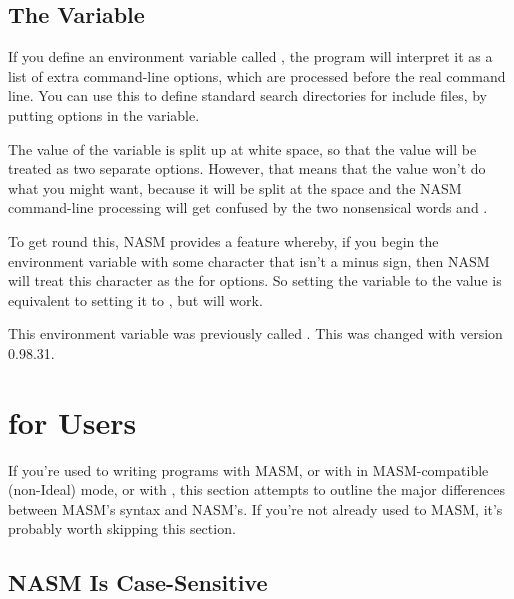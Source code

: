 \subsection{The   Variable}
\label{subsec:nasmenv}

If you define an environment variable called , the program
will interpret it as a list of extra command-line options, which are
processed before the real command line. You can use this to define
standard search directories for include files, by putting 
options in the  variable.

The value of the variable is split up at white space, so that the
value  will be treated as two separate options.
However, that means that the value  won't do
what you might want, because it will be split at the space and the
NASM command-line processing will get confused by the two
nonsensical words  and .

To get round this, NASM provides a feature whereby, if you begin the
 environment variable with some character that isn't
a minus sign, then NASM will treat this character as the
 for options. So setting the 
variable to the value  is equivalent to
setting it to , but 
will work.

This environment variable was previously called . This was
changed with version 0.98.31.

\section{ for  Users}
\label{subsec:qstart}

If you're used to writing programs with MASM, or with  in
MASM-compatible (non-Ideal) mode, or with , this section
attempts to outline the major differences between MASM's syntax and
NASM's. If you're not already used to MASM, it's probably worth
skipping this section.

\subsection{NASM Is Case-Sensitive}
\label{subsec:qscs}

